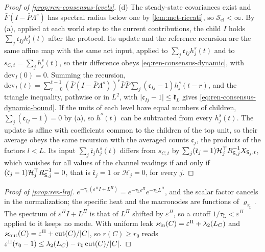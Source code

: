 \begin{proof}[Proof of \cref{prop:ren-consensus-levels}]
(d) The steady-state covariances exist and $\bar F(I-\bar P\Lambda^s)$ has spectral radius below one by \cref{lem:met-riccati}, so $\mathcal S_{\mathrm{cl}}<\infty$. By (a), applied at each world step to the current contributions, the child $I$ holds $\sum_j\mathfrak c_{Ij}h^s_j(t)$ after the protocol. Its update and the reference recursion are the same affine map with the same act input, applied to $\sum_j\mathfrak c_{Ij}h^s_j(t)$ and to $s_{C,t}=\sum_jh^s_j(t)$, so their difference obeys \eqref{eq:ren-consensus-dynamic}, with $\mathrm{dev}_I(0)=0$. Summing the recursion, $\mathrm{dev}_I(t)=\sum_{r=0}^{t-1}(\bar F(I-\bar P\Lambda^s))^r\bar F\bar P\sum_j(\mathfrak c_{Ij}-1)h^s_j(t-r)$, and the triangle inequality, pathwise or in $L^2$, with $\lvert\mathfrak c_{Ij}-1\rvert\le\mathfrak k_L$ gives \eqref{eq:ren-consensus-dynamic-bound}. If the units of each level have equal numbers of children, $\sum_j(\mathfrak c_{Ij}-1)=0$ by (a), so $\bar h^s(t)$ can be subtracted from every $h^s_j(t)$. The update is affine with coefficients common to the children of the top unit, so their average obeys the same recursion with the averaged counts $\bar{\mathfrak c}_j$, the products of the factors $l<L$. Its input $\sum_j\bar{\mathfrak c}_jh^s_j(t)$ differs from $s_{C,t}$ by $\sum_j(\bar{\mathfrak c}_j-1)\mathcal H_j^\top R_{\mathsf{S},j}^{-1}X_{\mathsf{S}_j,t}$, which vanishes for all values of the channel readings if and only if $(\bar{\mathfrak c}_j-1)\mathcal H_j^\top R_{\mathsf{S},j}^{-1}=0$, that is $\bar{\mathfrak c}_j=1$ or $\mathcal H_j=0$, for every $j$.
\end{proof}

\begin{proof}[Proof of \cref{prop:ren-lrg}]
$e^{-\tau_{\mathrm L}(\varepsilon^\Pi I+L^\Pi)}=e^{-\tau_{\mathrm L}\varepsilon^\Pi}e^{-\tau_{\mathrm L}L^\Pi}$, and the scalar factor cancels in the normalization; the specific heat and the macronodes are functions of $\varrho_{\tau_{\mathrm L}}$. The spectrum of $\varepsilon^\Pi I+L^\Pi$ is that of $L^\Pi$ shifted by $\varepsilon^\Pi$, so a cutoff $1/\tau_{\mathrm L}<\varepsilon^\Pi$ applied to it keeps no mode. With uniform leak $\varkappa_{\mathrm{in}}(C)=\varepsilon^\Pi+\lambda_2(L_C)$ and $\varkappa_{\mathrm{out}}(C)=\varepsilon^\Pi+\operatorname{cut}(C)/\lvert C\rvert$, so $r(C)\ge r_0$ reads $\varepsilon^\Pi(r_0-1)\le\lambda_2(L_C)-r_0\operatorname{cut}(C)/\lvert C\rvert$.
\end{proof}

